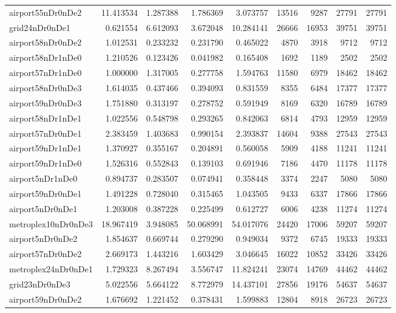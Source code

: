 \begin{longtable}{|l|r|r|r|r|r|r|r|r|}
airport55nDr0nDe2 & 11.413534 & 1.287388 & 1.786369 & 3.073757 & 13516 & 9287 & 27791 & 27791 \\
grid24nDr0nDe1 & 0.621554 & 6.612093 & 3.672048 & 10.284141 & 26666 & 16953 & 39751 & 39751 \\
airport58nDr0nDe2 & 1.012531 & 0.233232 & 0.231790 & 0.465022 & 4870 & 3918 & 9712 & 9712 \\
airport58nDr1nDe0 & 1.210526 & 0.123426 & 0.041982 & 0.165408 & 1692 & 1189 & 2502 & 2502 \\
airport57nDr1nDe0 & 1.000000 & 1.317005 & 0.277758 & 1.594763 & 11580 & 6979 & 18462 & 18462 \\
airport58nDr0nDe3 & 1.614035 & 0.437466 & 0.394093 & 0.831559 & 8355 & 6484 & 17377 & 17377 \\
airport59nDr0nDe3 & 1.751880 & 0.313197 & 0.278752 & 0.591949 & 8169 & 6320 & 16789 & 16789 \\
airport58nDr1nDe1 & 1.022556 & 0.548798 & 0.293265 & 0.842063 & 6814 & 4793 & 12959 & 12959 \\
airport57nDr0nDe1 & 2.383459 & 1.403683 & 0.990154 & 2.393837 & 14604 & 9388 & 27543 & 27543 \\
airport59nDr1nDe1 & 1.370927 & 0.355167 & 0.204891 & 0.560058 & 5909 & 4188 & 11241 & 11241 \\
airport59nDr1nDe0 & 1.526316 & 0.552843 & 0.139103 & 0.691946 & 7186 & 4470 & 11178 & 11178 \\
airport5nDr1nDe0 & 0.894737 & 0.283507 & 0.074941 & 0.358448 & 3374 & 2247 & 5080 & 5080 \\
airport59nDr0nDe1 & 1.491228 & 0.728040 & 0.315465 & 1.043505 & 9433 & 6337 & 17866 & 17866 \\
airport5nDr0nDe1 & 1.203008 & 0.387228 & 0.225499 & 0.612727 & 6006 & 4238 & 11274 & 11274 \\
metroplex10nDr0nDe3 & 18.967419 & 3.948085 & 50.068991 & 54.017076 & 24420 & 17006 & 59207 & 59207 \\
airport5nDr0nDe2 & 1.854637 & 0.669744 & 0.279290 & 0.949034 & 9372 & 6745 & 19333 & 19333 \\
airport57nDr0nDe2 & 2.669173 & 1.443216 & 1.603429 & 3.046645 & 16022 & 10852 & 33426 & 33426 \\
metroplex24nDr0nDe1 & 1.729323 & 8.267494 & 3.556747 & 11.824241 & 23074 & 14769 & 44462 & 44462 \\
grid23nDr0nDe3 & 5.022556 & 5.664122 & 8.772979 & 14.437101 & 27856 & 19176 & 54637 & 54637 \\
airport59nDr0nDe2 & 1.676692 & 1.221452 & 0.378431 & 1.599883 & 12804 & 8918 & 26723 & 26723 \\

\end{longtable}
